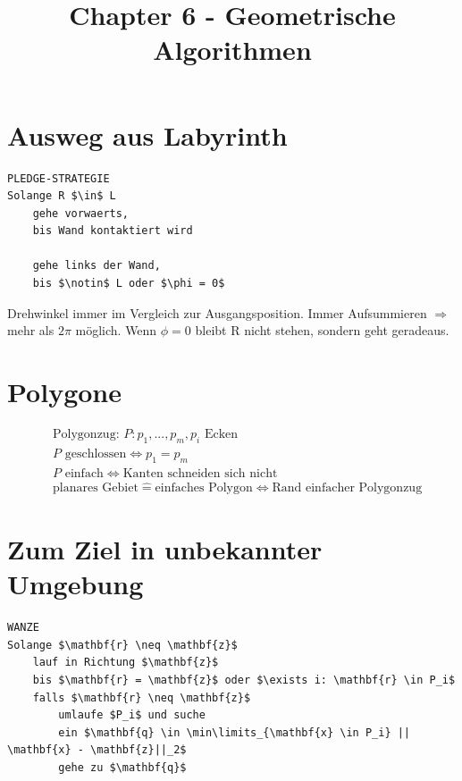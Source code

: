 \documentclass[8pt, DIV15, twocolumn]{scrartcl}
\title{Chapter 6 - Geometrische Algorithmen}
\date{}
\begin{document}
\setlength{\abovedisplayskip}{0pt}
\setlength{\belowdisplayskip}{0pt}
\setlength{\parskip}{0pt}
\setlength{\topmargin}{0pt}

 
\maketitle

\thispagestyle{empty}

\section*{Ausweg aus Labyrinth}

\begin{lstlisting}[mathescape=true]
PLEDGE-STRATEGIE
Solange R $\in$ L
	gehe vorwaerts, 
	bis Wand kontaktiert wird

	gehe links der Wand, 
	bis $\notin$ L oder $\phi = 0$
\end{lstlisting}

Drehwinkel immer im Vergleich zur Ausgangsposition. Immer Aufsummieren $\Rightarrow$ mehr als $2\pi$ möglich. Wenn $\phi = 0$ bleibt R nicht stehen, sondern geht geradeaus.

\section*{Polygone}

\begin{equation*}
\begin{aligned}
&\text{Polygonzug: } P: p_1,...,p_m, p_i \text{ Ecken} \\
&P \text{ geschlossen} \Leftrightarrow p_1 = p_m \\
&P \text{ einfach} \Leftrightarrow \text{Kanten schneiden sich nicht} \\
&\text{planares Gebiet} \hat{=} \text{einfaches Polygon} \Leftrightarrow \text{Rand einfacher Polygonzug}
\end{aligned}
\end{equation*}

\section*{Zum Ziel in unbekannter Umgebung}

\begin{lstlisting}[mathescape=true]
WANZE
Solange $\mathbf{r} \neq \mathbf{z}$
	lauf in Richtung $\mathbf{z}$
	bis $\mathbf{r} = \mathbf{z}$ oder $\exists i: \mathbf{r} \in P_i$
	falls $\mathbf{r} \neq \mathbf{z}$
		umlaufe $P_i$ und suche
		ein $\mathbf{q} \in \min\limits_{\mathbf{x} \in P_i} || \mathbf{x} - \mathbf{z}||_2$
		gehe zu $\mathbf{q}$
\end{lstlisting}
\end{document}
